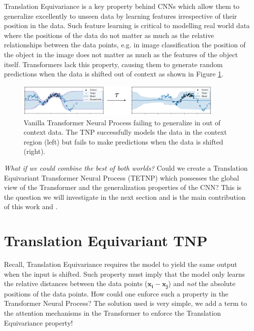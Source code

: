 \documentclass[../../main.tex]{subfiles}
\begin{document}
Translation Equivariance is a key property behind CNNs which allow them to generalize excellently to unseen data by learning features irrespective of their position in the data. Such feature learning is critical to modelling real world data where the positions of the data do not matter as much as the relative relationships between the data points, e.g. in image classification the position of the object in the image does not matter as much as the features of the object itself. Transformers lack this property, causing them to generate random predictions when the data is shifted out of context as shown in Figure \ref{fig:tnp-fail}.


\begin{figure}[H]
	\centering
	\includegraphics[width=0.9\textwidth]{./tnp-fail.png}
	\caption{Vanilla Transformer Neural Process failing to generalize in out of context data. The TNP successfully models the data in the context region (left) but fails to make predictions when the data is shifted (right).}
	\label{fig:tnp-fail}
\end{figure}

\emph{What if we could combine the best of both worlds?} Could we create a Translation Equivariant Transformer Neural Process (TETNP) which possesses the global view of the Transformer and the generalization properties of the CNN? This is the question we will investigate in the next section and is the main contribution of this work and \parencite{anonymous2024translationequivariant}.



\section{Translation Equivariant TNP}
\label{sec:tetnp}

Recall, Translation Equivariance requires the model to yield the same output when the input is shifted. Such property must imply that the model only learns the relative distances between the data points ($\bm{x_i} - \bm{x_j}$) and \emph{not} the absolute positions of the data points. How could one enforce such a property in the Transformer Neural Process? The solution used is very simple, we add a term to the attention mechanisms in the Transformer to enforce the Translation Equivariance property!
\end{document}
